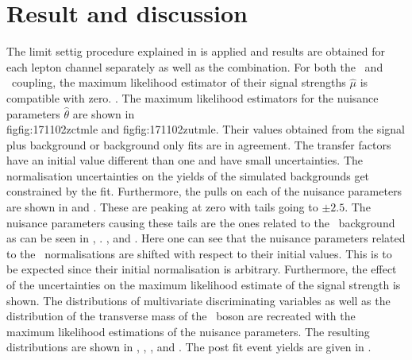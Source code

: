 \section{Result and discussion}
The limit settig procedure explained in  is applied and results are obtained for each lepton channel separately as well as the combination. For both the \Zut\ and \Zct\ coupling, the maximum likelihood estimator of their signal strengths $\hat{\mu}$ is compatible with zero. . The maximum likelihood estimators for the nuisance parameters $\hat{\theta}$ are shown in \\fig{fig:171102zctmle} and fig{fig:171102zutmle}. Their values obtained from the signal plus background or background only fits are in agreement. The transfer factors have an initial value different than one and have small uncertainties. The normalisation uncertainties on the yields of the simulated backgrounds get constrained by the fit. Furthermore, the pulls  on each of the nuisance parameters are shown in  and . These are peaking at zero with tails going to $\pm2.5$. The nuisance parameters causing these tails are the ones related to the \NPL\ background as can be seen in , . , and . Here one can see that the nuisance parameters related to the \NPL\ normalisations are shifted with respect to their initial values. This is to be expected since their initial  normalisation is arbitrary. Furthermore, the effect of the uncertainties on the maximum likelihood estimate of the signal strength is shown.   The distributions of multivariate discriminating  variables as well as the distribution of the transverse mass of the \PW\ boson are recreated with the maximum likelihood estimations of the nuisance parameters. The resulting distributions are shown in , , , and . The post fit event yields are given in  . 

